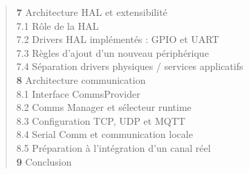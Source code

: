 \begin{quote}
\textbf{7} \hspace{1em} Architecture HAL et extensibilité \dotfill \pageref{sec:hal}\\
\hspace{2.5em}7.1 \hspace{0.5em} Rôle de la HAL \dotfill \pageref{subsec:hal_role}\\
\hspace{2.5em} 7.2 \hspace{0.5em} Drivers HAL implémentés : GPIO et UART \dotfill \pageref{subsec:hal_ajout}\\
\hspace{2.5em} 7.3 \hspace{0.5em} Règles d'ajout d'un nouveau périphérique \dotfill \pageref{subsec:hal_stubs}\\
\hspace{2.5em} 7.4 \hspace{0.5em} Séparation drivers physiques / services applicatifs \dotfill \pageref{subsec:hal_sep}\\
\textbf{8} \hspace{1em} Architecture communication \dotfill \pageref{sec:comms}\\
\hspace{2.5em} 8.1 \hspace{0.5em} Interface CommsProvider \dotfill \pageref{subsec:comms_iface}\\
\hspace{2.5em} 8.2 \hspace{0.5em} Comms Manager et sélecteur runtime \dotfill \pageref{subsec:comms_sel}\\
\hspace{2.5em} 8.3 \hspace{0.5em} Configuration TCP, UDP et MQTT \dotfill \pageref{subsec:comms_config}\\
\hspace{2.5em} 8.4 \hspace{0.5em} Serial Comm et communication locale \dotfill \pageref{subsec:comms_mocks}\\
\hspace{2.5em} 8.5 \hspace{0.5em} Préparation à l'intégration d'un canal réel \dotfill \pageref{subsec:comms_reel}\\
\textbf{9} \hspace{1em} Conclusion \dotfill \pageref{sec:conclu_ch3}\\
\end{quote}

